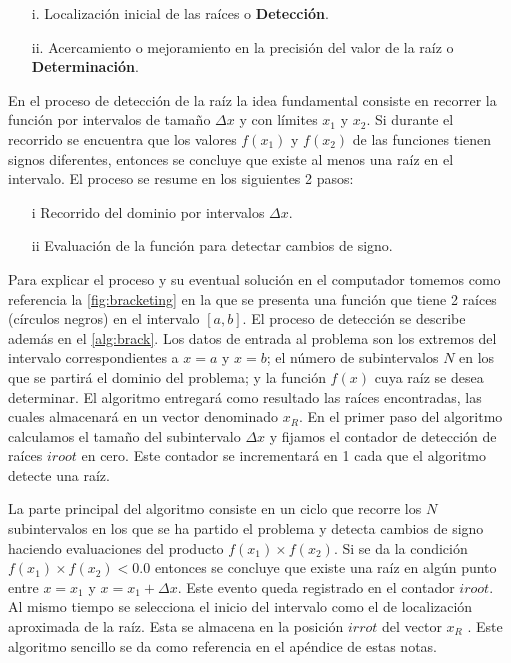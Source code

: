 \begin{itemize}
	\item[i.] Localización inicial de las raíces o {\bf Detección}.
	\item[ii.] Acercamiento o mejoramiento en la precisión del valor de la raíz o {\bf Determinación}.
\end{itemize}

En el proceso de detección de la raíz la idea fundamental consiste en recorrer 
la función por intervalos de tamaño $\Delta x$ y con límites $x_1$ y $x_2$. Si 
durante el recorrido se encuentra que los valores $f(x_1)$ y $f(x_2)$ de las 
funciones tienen signos diferentes, entonces se concluye que existe al menos 
una raíz en el intervalo. El proceso se resume en los siguientes 2 pasos:

\begin{itemize}
	\item[i]  Recorrido del dominio por intervalos $\Delta x$.
	\item[ii] Evaluación de la función para detectar cambios de signo.
\end{itemize}

Para explicar el proceso y su eventual solución en el computador tomemos como 
referencia la \cref{fig:bracketing} en la que se presenta una función que tiene 
2 raíces (círculos negros) en el intervalo $[a,b]$. El proceso de detección se 
describe además en el \cref{alg:brack}. Los datos de entrada al problema son 
los extremos del intervalo correspondientes a $x=a$ y $x=b$; el número de 
subintervalos $N$ en los que se partirá el dominio del problema; y la función 
$f(x)$ cuya raíz se desea determinar.  El algoritmo entregará como resultado 
las raíces encontradas, las cuales almacenará en un vector denominado $x_R$. En 
el primer paso del algoritmo calculamos el tamaño del subintervalo $\Delta x$ y 
fijamos el contador de detección de raíces $iroot$ en cero. Este contador se 
incrementará en 1 cada que el algoritmo detecte una raíz.

La parte principal del algoritmo consiste en un ciclo que recorre los $N$ 
subintervalos en los que se ha partido el problema y detecta cambios de signo 
haciendo evaluaciones del producto $f (x_1) \times f (x_2).$ Si se da la 
condición $f \left( x_1 \right) \times f \left( x_2 \right) < 0.0$ entonces se 
concluye que existe una raíz en algún punto entre $x=x_1$ y $x=x_1+ \Delta x$. 
Este evento queda registrado en el contador $iroot$. Al mismo tiempo se 
selecciona el inicio del intervalo como el de localización aproximada de la 
raíz. Esta se almacena en la posición $irrot$ del vector $x_R$ . Este algoritmo 
sencillo se da como referencia en el apéndice de estas notas.

